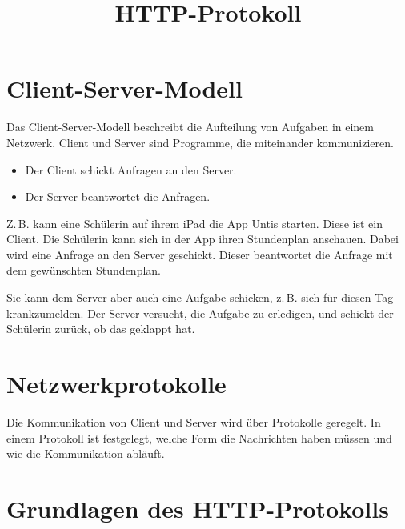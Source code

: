 \documentclass[a4paper]{scrartcl}
\date{}
\title{HTTP-Protokoll}
\begin{document}
\maketitle
\section{Client-Server-Modell}\label{sec:client-server-modell}


Das Client-Server-Modell beschreibt die Aufteilung von Aufgaben in einem Netzwerk.
Client und Server sind Programme, die miteinander kommunizieren.


\begin{itemize}
\item Der Client schickt Anfragen an den Server. 
\item Der Server beantwortet die Anfragen.
\end{itemize}

Z.\,B. kann eine Schülerin auf ihrem iPad die App Untis starten.
Diese ist ein Client.
Die Schülerin kann sich in der App ihren Stundenplan anschauen.
Dabei wird eine Anfrage an den Server geschickt.
Dieser beantwortet die Anfrage mit dem gewünschten Stundenplan.

Sie kann dem Server aber auch eine Aufgabe schicken, z.\,B. sich für diesen Tag krankzumelden.
Der Server versucht, die Aufgabe zu erledigen, und schickt der Schülerin zurück, ob das geklappt hat.

\section{Netzwerkprotokolle}\label{sec:netzwerkprotokolle}

Die Kommunikation von Client und Server wird über Protokolle geregelt.
In einem Protokoll ist festgelegt, welche Form die Nachrichten haben müssen und wie die Kommunikation abläuft.

\section{Grundlagen des HTTP-Protokolls}\label{sec:grundlagen-des-http-protokolls}
\end{document}
